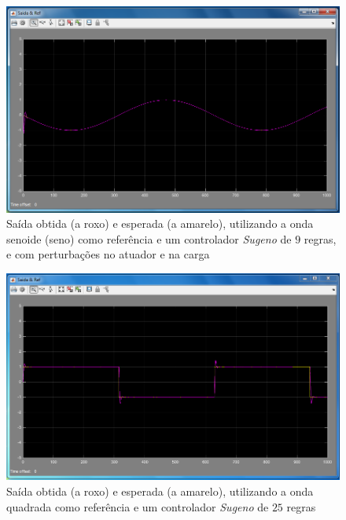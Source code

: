 \documentclass{article}
\begin{document}
\begin{figure}[h]
  \centering
      \includegraphics[scale=0.3]{Images/Sugeno_9_sin_actuator_charge.png}
  \caption{Saída obtida (a roxo) e esperada (a amarelo), utilizando a onda senoide (seno) como referência e um controlador \emph{Sugeno} de $9$ regras, e com perturbações no atuador e na carga}
\end{figure}


\begin{figure}[h]
  \centering
      \includegraphics[scale=0.3]{Images/Sugeno_25_square.png}
  \caption{Saída obtida (a roxo) e esperada (a amarelo), utilizando a onda quadrada como referência e um controlador \emph{Sugeno} de $25$ regras}
\end{figure}
\end{document}

